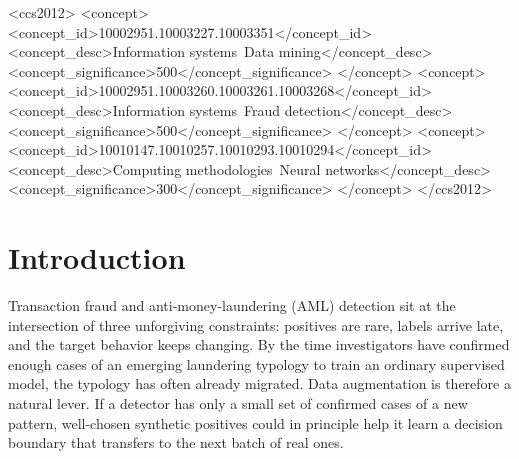 \documentclass[sigconf,review,anonymous]{acmart}
\begin{document}
\begin{CCSXML}
<ccs2012>
   <concept>
       <concept_id>10002951.10003227.10003351</concept_id>
       <concept_desc>Information systems~Data mining</concept_desc>
       <concept_significance>500</concept_significance>
   </concept>
   <concept>
       <concept_id>10002951.10003260.10003261.10003268</concept_id>
       <concept_desc>Information systems~Fraud detection</concept_desc>
       <concept_significance>500</concept_significance>
   </concept>
   <concept>
       <concept_id>10010147.10010257.10010293.10010294</concept_id>
       <concept_desc>Computing methodologies~Neural networks</concept_desc>
       <concept_significance>300</concept_significance>
   </concept>
</ccs2012>
\end{CCSXML}



\maketitle

\section{Introduction}
\label{sec:intro}

Transaction fraud and anti-money-laundering (AML) detection sit at the
intersection of three unforgiving constraints: positives are rare, labels
arrive late, and the target behavior keeps changing. By the time investigators
have confirmed enough cases of an emerging laundering typology to train an
ordinary supervised model, the typology has often already migrated. Data
augmentation is therefore a natural lever. If a detector has only a small set
of confirmed cases of a new pattern, well-chosen synthetic positives could in
principle help it learn a decision boundary that transfers to the next batch
of real ones.
\end{document}
